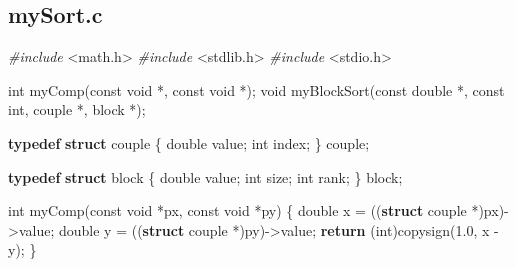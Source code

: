 \documentclass[
  12pt,
]{book}
\newenvironment{Shaded}{\begin{snugshade}}{\end{snugshade}}
\newcommand{\ControlFlowTok}[1]{\textcolor[rgb]{0.13,0.29,0.53}{\textbf{#1}}}
\newcommand{\DataTypeTok}[1]{\textcolor[rgb]{0.13,0.29,0.53}{#1}}
\newcommand{\FloatTok}[1]{\textcolor[rgb]{0.00,0.00,0.81}{#1}}
\newcommand{\ImportTok}[1]{#1}
\newcommand{\KeywordTok}[1]{\textcolor[rgb]{0.13,0.29,0.53}{\textbf{#1}}}
\newcommand{\NormalTok}[1]{#1}
\newcommand{\PreprocessorTok}[1]{\textcolor[rgb]{0.56,0.35,0.01}{\textit{#1}}}
\theoremstyle{definition}
\theoremstyle{definition}
\theoremstyle{definition}
\theoremstyle{definition}
\theoremstyle{remark}
\begin{document}
\hypertarget{mysort.c}{%
\subsection{mySort.c}\label{mysort.c}}

\begin{Shaded}
\begin{Highlighting}[]

\PreprocessorTok{\#include }\ImportTok{\textless{}math.h\textgreater{}}
\PreprocessorTok{\#include }\ImportTok{\textless{}stdlib.h\textgreater{}}
\PreprocessorTok{\#include }\ImportTok{\textless{}stdio.h\textgreater{}}

\DataTypeTok{int}\NormalTok{ myComp(}\DataTypeTok{const} \DataTypeTok{void}\NormalTok{ *, }\DataTypeTok{const} \DataTypeTok{void}\NormalTok{ *);}
\DataTypeTok{void}\NormalTok{ myBlockSort(}\DataTypeTok{const} \DataTypeTok{double}\NormalTok{ *, }\DataTypeTok{const} \DataTypeTok{int}\NormalTok{, couple *, block *);}

\KeywordTok{typedef} \KeywordTok{struct}\NormalTok{ couple \{}
    \DataTypeTok{double}\NormalTok{ value;}
    \DataTypeTok{int}\NormalTok{ index;}
\NormalTok{\} couple;}

\KeywordTok{typedef} \KeywordTok{struct}\NormalTok{ block \{}
    \DataTypeTok{double}\NormalTok{ value;}
    \DataTypeTok{int}\NormalTok{ size;}
    \DataTypeTok{int}\NormalTok{ rank;}
\NormalTok{\} block;}

\DataTypeTok{int}\NormalTok{ myComp(}\DataTypeTok{const} \DataTypeTok{void}\NormalTok{ *px, }\DataTypeTok{const} \DataTypeTok{void}\NormalTok{ *py) \{}
    \DataTypeTok{double}\NormalTok{ x = ((}\KeywordTok{struct}\NormalTok{ couple *)px){-}\textgreater{}value;}
    \DataTypeTok{double}\NormalTok{ y = ((}\KeywordTok{struct}\NormalTok{ couple *)py){-}\textgreater{}value;}
    \ControlFlowTok{return}\NormalTok{ (}\DataTypeTok{int}\NormalTok{)copysign(}\FloatTok{1.0}\NormalTok{, x {-} y);}
\NormalTok{\}}


\end{Highlighting}
\end{Shaded}
\end{document}
